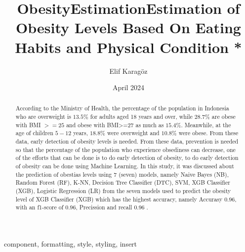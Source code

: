 \documentclass[conference]{IEEEtran}
\title{ObesityEstimation}
\author{Elif Karagöz}
\date{April 2024}
\begin{document}
\title{Estimation of Obesity Levels Based On Eating Habits and Physical Condition *\\
}

\author{
\and
{}
}

\maketitle


\begin{abstract}
According to the Ministry of Health, the percentage of the population in Indonesia who are overweight is $13.5 \%$ for adults aged 18 years and over, while $28.7 \%$ are obese with BMI $>=25$ and obese with BMI>=27 as much as $15.4 \%$. Meanwhile, at the age of children $5-12$ years, $18.8 \%$ were overweight and $10.8 \%$ were obese. From these data, early detection of obesity levels is needed. From these data, prevention is needed so that the percentage of the population who experience obsediness can decrease, one of the efforts that can be done is to do early detection of obesity, to do early detection of obesity can be done using Machine Learning. In this study, it was discussed about the prediction of obestias levels using 7 (seven) models, namely Naive Bayes (NB), Random Forest (RF), K-NN, Decision Tree Classifier (DTC), SVM, XGB Classifier (XGB), Logistic Regression (LR) from the seven models used to predict the obesity level of XGB Classifier (XGB) which has the highest accuracy, namely Accurasy 0.96, with an f1-score of 0.96, Precission and recall 0.96 .
\end{abstract}

\begin{IEEEkeywords}
component, formatting, style, styling, insert
\end{IEEEkeywords}
\end{document}
